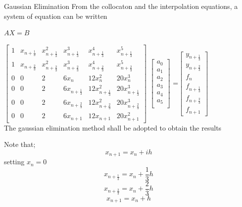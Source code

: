 \documentclass[compress, 19pt, blue]{beamer}
\begin{document}
\begin{frame}{Gaussian Elimination}
\noindent From the collocaton and the interpolation equations, a system of equation can be written

\begin{center}
	$AX = B$
\end{center}

$\begin{bmatrix}
1 & x_{n+\frac{1}{3}} & x^{2}_{n+\frac{1}{3}} &  x^{3}_{n+\frac{1}{3}} & x^{4}_{n+\frac{1}{3}}& x^{5}_{n+\frac{1}{3}}\\
1 & x_{n+\frac{2}{3}} & x^{2}_{n+\frac{2}{3}} &  x^{3}_{n+\frac{2}{3}} & x^{4}_{n+\frac{2}{3}} & x^{5}_{n+\frac{2}{3}} \\
0&0 & 2 & 6x_n &  12x^2_{n} & 20x^{3}_{n} \\
0&0 & 2 & 6x_{n+\frac{1}{3}} &  12x^2_{n+\frac{1}{3}} & 20x^{3}_{n+\frac{1}{3}} \\
0&0 & 2 & 6x_{n+\frac{2}{3}} &  12x^2_{n+\frac{2}{3}} & 20x^{3}_{n+\frac{2}{3}} \\
0 & 0&2 & 6x_{n+1} &  12x_{n+1} & 20x^{2}_{n+1} 
\end{bmatrix}$
$\begin{bmatrix} a_{0}\\ a_{1} \\ a_{2} \\ a_{3}\\ a_{4}\\ a_{5}\\  \end{bmatrix}$
=$\begin{bmatrix} y_{n+\frac{1}{3}}\\ y_{n+\frac{2}{3}} \\ f_{n}\\ f_{n+\frac{1}{3}}\\ f_{n+\frac{2}{3}}\\ f_{n+1}
\end{bmatrix}$\\

\noindent The gaussian elimination method shall be adopted to obtain the results

\end{frame}

\begin{frame}
	Note that;
	$$x_{n+1}=x_n+ih$$
	setting $x_n=0$
	$$x_{n+\frac{1}{3}}=x_n +\frac{1}{3}h$$
	$$x_{n+\frac{2}{3}}=x_n +\frac{2}{3}h$$
	$$x_{n+1}=x_n +h$$
	
\end{frame}
\end{document}
